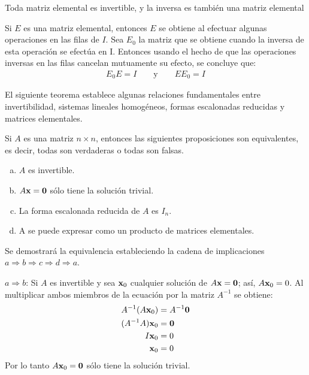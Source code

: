 \documentclass[a4paper,12pt]{article}
\begin{document}
\begin{theorem}
  Toda matriz elemental es invertible, y la inversa es también una matriz
  elemental
  \label{theo:elematr}
\end{theorem}

\demo Si $E$ es una matriz elemental, entonces $E$ se obtiene al efectuar
algunas operaciones en las filas de $I$. Sea $E_0$ la matriz que se obtiene
cuando la inversa de esta operación se efectúa en I. Entonces usando el hecho
de que las operaciones inversas en las filas cancelan mutuamente su efecto, se
concluye que:
\begin{align*}
  E_0E=I \qquad \mbox{y} \qquad EE_0=I
\end{align*}

El siguiente teorema establece algunas relaciones fundamentales entre
invertibilidad, sistemas lineales homogéneos, formas escalonadas reducidas y
matrices elementales.

\begin{theorem}
  Si $A$ es una matriz $n\times n$, entonces las siguientes proposiciones son
  equivalentes, es decir, todas son verdaderas o todas son falsas.
  \begin{enumerate}[(a)]
    \item $A$ es invertible.
    \item $A\textbf{x}=\textbf{0}$ sólo tiene la solución trivial.
    \item La forma escalonada reducida de $A$ es $I_n$.
    \item A se puede expresar como un producto de matrices elementales.
  \end{enumerate}
  \label{theo:relacfund}
\end{theorem}

\demo Se demostrará la equivalencia estableciendo la cadena de implicaciones
$a\Rightarrow b\Rightarrow c\Rightarrow d\Rightarrow a$.

$a\Rightarrow b$: Si $A$ es invertible y sea  $\textbf{x}_0$ cualquier solución de
$A\textbf{x}=\textbf{0}$; así, $A\textbf{x}_0=0$. Al multiplicar ambos miembros de la
ecuación por la matriz $A^{-1}$ se obtiene:
\begin{align*}
  A^{-1}(A\textbf{x}_0) &= A^{-1}\textbf{0} \\
  (A^{-1}A)\textbf{x}_0 &= \textbf{0} \\
          I\textbf{x}_0 &= 0 \\
           \textbf{x}_0 &= 0
\end{align*}
Por lo tanto $A\textbf{x}_0=\textbf{0}$ sólo tiene la solución trivial.
\end{document}
